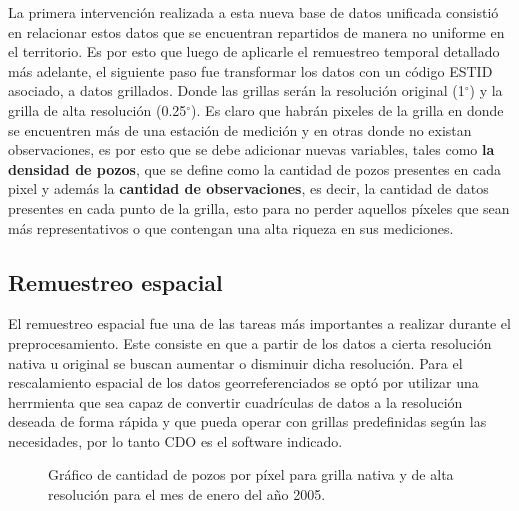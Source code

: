     La primera intervención realizada a esta nueva base de datos unificada consistió en relacionar estos datos que se encuentran repartidos de manera no uniforme en el territorio. Es por esto que luego de aplicarle el remuestreo temporal detallado más adelante, el siguiente paso fue transformar los datos con un código ESTID asociado,
    a datos grillados. Donde las grillas serán la resolución original (1$^{\circ}$) y la grilla de alta resolución (0.25$^{\circ}$). Es claro que habrán pixeles de la grilla en donde 
    se encuentren más de una estación de medición y en otras donde no existan observaciones, es por esto que se debe adicionar nuevas variables, tales como \textbf{la densidad de pozos}, que se define como la cantidad de pozos presentes en cada pixel y además
    la \textbf{cantidad de observaciones}, es decir, la cantidad de datos presentes en cada punto de la grilla, esto para no perder aquellos píxeles que sean más representativos o que 
    contengan una alta riqueza en sus mediciones.

    \subsection{Remuestreo espacial}
    
    El remuestreo espacial fue una de las tareas más importantes a realizar durante el preprocesamiento. Este consiste en que a partir de los datos a cierta
    resolución nativa u original se buscan aumentar o disminuir dicha resolución. Para el rescalamiento espacial de los datos georreferenciados se optó por utilizar una herrmienta que sea capaz de convertir 
    cuadrículas de datos a la resolución deseada de forma rápida y que pueda operar con grillas predefinidas según las necesidades, por lo tanto CDO es el software indicado. 

    
    \begin{figure}[H]
        \centering
              \goodgap
              \vskip -0.1in
        \caption[Cantidad de pozos en cada grilla]{Gráfico de cantidad de pozos por píxel para grilla nativa y de alta resolución para el mes de enero del año 2005.}
        \label{pixeldepth}
    \end{figure}

